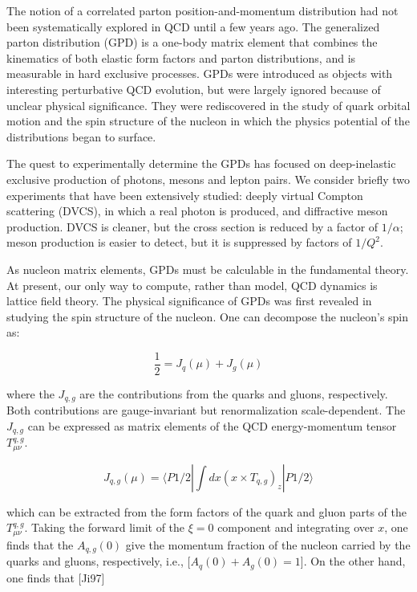 The notion of a correlated parton position-and-momentum distribution had not been systematically explored in QCD until a few years ago. The generalized parton distribution (GPD) is a one-body matrix element that combines the kinematics of both elastic form factors and parton distributions, and is measurable in hard exclusive processes. GPDs were introduced as objects with interesting perturbative QCD evolution, but were largely ignored because of unclear physical significance. They were rediscovered in the study of quark orbital motion and the spin structure of the nucleon in which the physics potential of the distributions began to surface.

The quest to experimentally determine the GPDs has focused on deep-inelastic exclusive production of photons, mesons and lepton pairs. We consider briefly two experiments that have been extensively studied: deeply virtual Compton scattering (DVCS), in which a real photon is produced, and diffractive meson production. DVCS is cleaner, but the cross section is reduced by a factor of $1/\alpha$; meson production is easier to detect, but it is suppressed by factors of $1/Q^2$.

As nucleon matrix elements, GPDs must be calculable in the fundamental theory. At present, our only way to compute, rather than model, QCD dynamics is lattice field theory. The physical significance of GPDs was first revealed in studying the spin structure of the nucleon. One can decompose the nucleon's spin as:



\begin{equation}
\frac{1}{2} = J_q(\mu) + J_g(\mu)
\end{equation}

where the $J_{q,g}$ are the contributions from the quarks and gluons, respectively. Both contributions are gauge-invariant but renormalization scale-dependent. The $J_{q,g}$ can be expressed as matrix elements of the QCD energy-momentum tensor $T_{\mu \nu}^{q,g}$.

\begin{equation}
J_{q,g}(\mu) = \langle P1/2 \left| \int dx(x \times T_{q,g})_z \right| P1/2 \rangle
\end{equation}



which can be extracted from the form factors of the quark and gluon parts of the $T_{\mu \nu}^{q,g}$. Taking the forward limit of the $\xi = 0$ component and integrating over $x$, one finds that the $A_{q,g}(0)$ give the momentum fraction of the nucleon carried by the quarks and gluons, respectively, i.e., [$A_q(0) + A_g(0) = 1$]. On the other hand, one finds that [Ji97]



